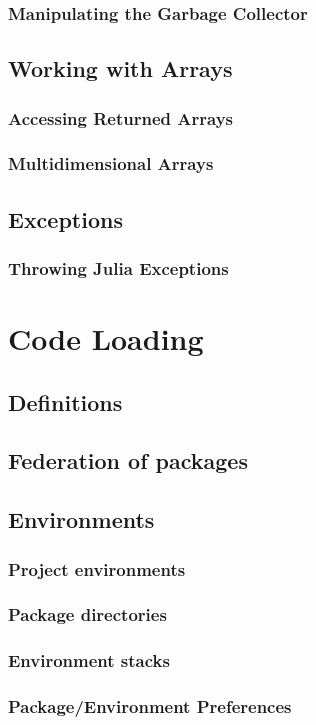     \subsection{Manipulating the Garbage Collector}
    \section{Working with Arrays}
    \subsection{Accessing Returned Arrays}
    \subsection{Multidimensional Arrays}
    \section{Exceptions}
    \subsection{Throwing Julia Exceptions}
  \chapter{Code Loading}
    \section{Definitions}
    \section{Federation of packages}
    \section{Environments}
    \subsection{Project environments}
    \subsection{Package directories}
    \subsection{Environment stacks}
    \subsection{Package/Environment Preferences}
